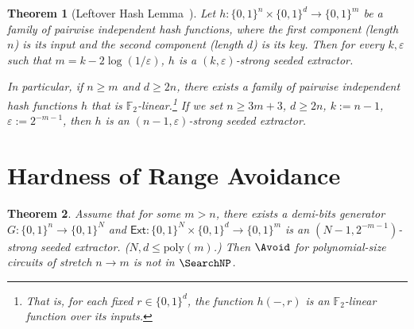 \documentclass[10pt,a4paper]{article}
\newtheorem{theorem}{Theorem}[section]
\theoremstyle{definition}
\theoremstyle{remark}
\renewcommand{\poly}{\mathrm{poly}}
\newcommand{\eps}{\varepsilon}
\newcommand{\Ext}{\mathsf{Ext}}
\newcommand{\F}{\mathbb{F}}
\begin{document}
\begin{theorem}[Leftover Hash Lemma~\cite{ILL89}]\label{thm:lhl}
	Let $h: \{0, 1\}^n \times \{0, 1\}^d \to \{0, 1\}^m$ be a family of pairwise independent hash functions, where the first component (length $n$) is its input and the second component (length $d$) is its key. Then for every $k, \eps$ such that $m = k - 2\log(1/\eps)$, $h$ is a $(k, \eps)$-strong seeded extractor.

    In particular, if $n\geq m$ and $d\geq 2n$, there exists a family of pairwise independent hash functions $h$ that is $\F_2$-linear.\footnote{That is, for each fixed $r\in \{0, 1\}^d$, the function $h(-, r)$ is an $\F_2$-linear function over its inputs.} If we set $n\geq 3m+3$, $d\geq 2n$, $k:=n-1$, $\eps := 2^{-m-1}$, then $h$ is an $(n-1, \eps)$-strong seeded extractor.
\end{theorem}


\section{Hardness of Range Avoidance}\label{sec: Avoid notin FP}



\begin{theorem}\label{thm: demi-bit to Avoid notin FP}
	Assume that for some $m > n$, there exists a demi-bits generator $G: \{0, 1\}^n \to \{0, 1\}^N$ and $\Ext: \{0, 1\}^N \times \{0, 1\}^d \to \{0, 1\}^m$ is an $(N-1, 2^{-m-1})$-strong seeded extractor. ($N,d\leq\poly(m)$.) Then $\Avoid$ for polynomial-size circuits of stretch $n\to m$ is not in $\SearchNP$.  %
\end{theorem}
\end{document}
